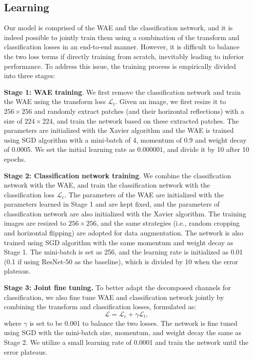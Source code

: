 \documentclass[letterpaper]{article} %
\begin{document}
\subsection{Learning}
Our model is comprised of the WAE and the classification network, and it is indeed possible to jointly train them using a combination of the transform and classification losses in an end-to-end manner. However, it is difficult to balance the two loss terms if directly training from scratch, inevitably leading to inferior performance. To address this issue, the training process is empirically divided into three stages:

\noindent\textbf{Stage 1: WAE training}. We first remove the classification network and train the WAE using the transform loss $\mathcal{L}_t$. Given an image, we first resize it to $256 \times 256$ and randomly extract patches (and their horizontal reflections) with a size of $224 \times 224$, and train the network based on these extracted patches. The parameters are  initialized with the Xavier algorithm \cite{glorot2010understanding} and the WAE is trained using SGD algorithm with a mini-batch of 4, momentum of 0.9 and weight decay of 0.0005. We set the initial learning rate as 0.000001, and divide it by 10 after 10 epochs.

\noindent\textbf{Stage 2: Classification network training}. We combine the classification network with the WAE, and train the classification network with the classification loss $\mathcal{L}_{{c}}$. The parameters of the WAE are initialized with the parameters learned in Stage 1 and are kept fixed, and the parameters of classification network are also initialized with the Xavier algorithm. The training images are resized to $256 \times 256$, and the same strategies (i.e., random cropping and horizontal flipping) are adopted for data augmentation. The network is also trained using SGD algorithm with the same momentum and weight decay as Stage 1. The mini-batch is set as 256, and the learning rate is initialized as 0.01 (0.1 if using ResNet-50 as the baseline), which is divided by 10 when the error plateaus.

\noindent\textbf{Stage 3: Joint fine tuning.} To better adapt the decomposed channels for classification, we also fine tune WAE and classification network jointly by combining the transform and classification losses, formulated as:
\begin{equation}
\mathcal{L}=\mathcal{L}_c+\gamma\mathcal{L}_t,
\end{equation}
where $\gamma$ is set to be 0.001 to balance the two losses. The network is fine tuned using SGD with the mini-batch size, momentum, and weight decay the same as Stage 2. We utilize a small learning rate of 0.0001 and train the network until the error plateaus.
\end{document}
